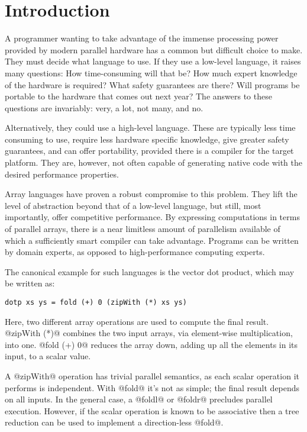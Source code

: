 \chapter{Introduction}
\label{sec:introduction}

A programmer wanting to take advantage of the immense processing power provided by modern parallel hardware has a common but difficult choice to make. They must decide what language to use. If they use a low-level language, it raises many questions: How time-consuming will that be? How much expert knowledge of the hardware is required?  What safety guarantees are there? Will programs be portable to the hardware that comes out next year? The answers to these questions are invariably: very, a lot, not many, and no.

Alternatively, they could use a high-level language. These are typically less time consuming to use, require less hardware specific knowledge, give greater safety guarantees, and can offer portability, provided there is a compiler for the target platform. They are, however, not often capable of generating native code with the desired performance properties.

Array languages have proven a robust compromise to this problem. They lift the level of abstraction beyond that of a low-level language, but still, most importantly, offer competitive performance. By expressing computations in terms of parallel arrays, there is a near limitless amount of parallelism available of which a sufficiently smart compiler can take advantage. Programs can be written by domain experts, as opposed to high-performance computing experts.

The canonical example for such languages is the vector dot product, which may be written as:

\begin{lstlisting}
dotp xs ys = fold (+) 0 (zipWith (*) xs ys)
\end{lstlisting}

Here, two different array operations are used to compute the final result. @zipWith (*)@ combines the two input arrays, via element-wise multiplication, into one. @fold (+) 0@ reduces the array down, adding up all the elements in its input, to a scalar value.

A @zipWith@ operation has trivial parallel semantics, as each scalar operation it performs is independent. With @fold@ it's not as simple; the final result depends on all inputs. In the general case, a @foldl@ or @foldr@ precludes parallel execution. However, if the scalar operation is known to be associative then a tree reduction can be used to implement a direction-less @fold@.

